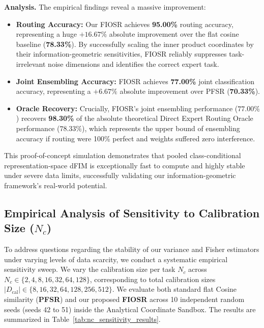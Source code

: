 \textbf{Analysis.}
The empirical findings reveal a massive improvement:
\begin{itemize}\setlength{\itemsep}{0.5pt}\setlength{\parskip}{0pt}
    \item \textbf{Routing Accuracy:} Our FIOSR achieves \textbf{95.00\%} routing accuracy, representing a huge $+16.67\%$ absolute improvement over the flat cosine baseline (\textbf{78.33\%}). By successfully scaling the inner product coordinates by their information-geometric sensitivities, FIOSR reliably suppresses task-irrelevant noise dimensions and identifies the correct expert task.
    \item \textbf{Joint Ensembling Accuracy:} FIOSR achieves \textbf{77.00\%} joint classification accuracy, representing a $+6.67\%$ absolute improvement over PFSR (\textbf{70.33\%}).
    \item \textbf{Oracle Recovery:} Crucially, FIOSR's joint ensembling performance ($77.00\%$) recovers \textbf{98.30\%} of the absolute theoretical Direct Expert Routing Oracle performance ($78.33\%$), which represents the upper bound of ensembling accuracy if routing were 100\% perfect and weights suffered zero interference.
\end{itemize}
This proof-of-concept simulation demonstrates that pooled class-conditional representation-space dFIM is exceptionally fast to compute and highly stable under severe data limits, successfully validating our information-geometric framework's real-world potential.

\subsection{Empirical Analysis of Sensitivity to Calibration Size ($N_c$)}
\label{sec:app_nc_sensitivity}

To address questions regarding the stability of our variance and Fisher estimators under varying levels of data scarcity, we conduct a systematic empirical sensitivity sweep. We vary the calibration size per task $N_c$ across $N_c \in \{2, 4, 8, 16, 32, 64, 128\}$, corresponding to total calibration sizes $|D_{\text{cal}}| \in \{8, 16, 32, 64, 128, 256, 512\}$. We evaluate both standard flat Cosine similarity (\textbf{PFSR}) and our proposed \textbf{FIOSR} across 10 independent random seeds (seeds 42 to 51) inside the Analytical Coordinate Sandbox. The results are summarized in Table~\ref{tab:nc_sensitivity_results}.

